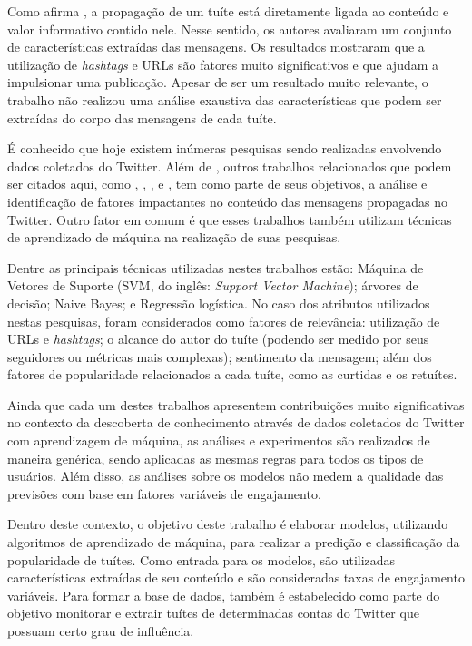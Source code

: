\documentclass[oneside,openright,12pt]{ufsm_2015} %
\begin{document}
{    \par Como afirma \cite{ieee:suh:10}, a propagação de um tuíte está diretamente ligada ao conteúdo e valor informativo contido nele. Nesse sentido, os autores avaliaram um conjunto de características extraídas das mensagens. Os resultados mostraram que a utilização de \textit{hashtags} e URLs são fatores muito significativos e que ajudam a impulsionar uma publicação. Apesar de ser um resultado muito relevante, o trabalho não realizou uma análise exaustiva das características que podem ser extraídas do corpo das mensagens de cada tuíte.
    
    \par É conhecido que hoje existem inúmeras pesquisas sendo realizadas envolvendo dados coletados do Twitter. Além de \cite{ieee:suh:10}, outros trabalhos relacionados que podem ser citados aqui, como \cite{acm:duan:2010}, \cite{benevenuto:2010}, \cite{acm:naveed:2011}, \cite{kharde:2016} e \cite{ieee:xu:2012}, tem como parte de seus objetivos, a análise e identificação de fatores impactantes no conteúdo das mensagens propagadas no Twitter. Outro fator em comum é que esses trabalhos também utilizam técnicas de aprendizado de máquina na realização de suas pesquisas.
    
    \par Dentre as principais técnicas utilizadas nestes trabalhos estão: Máquina de Vetores de Suporte (SVM, do inglês: \textit{Support Vector Machine}); árvores de decisão; Naive Bayes; e Regressão logística. No caso dos atributos utilizados nestas pesquisas, foram considerados como fatores de relevância: utilização de URLs e \textit{hashtags}; o alcance do autor do tuíte (podendo ser medido por seus seguidores ou métricas mais complexas); sentimento da mensagem; além dos fatores de popularidade relacionados a cada tuíte, como as curtidas e os retuítes.
    
    \par Ainda que cada um destes trabalhos apresentem contribuições muito significativas no contexto da descoberta de conhecimento através de dados coletados do Twitter com aprendizagem de máquina, as análises e experimentos são realizados de maneira genérica, sendo aplicadas as mesmas regras para todos os tipos de usuários. Além disso, as análises sobre os modelos não medem a qualidade das previsões com base em fatores variáveis de engajamento.

    \par Dentro deste contexto, o objetivo deste trabalho é elaborar modelos, utilizando algoritmos de aprendizado de máquina, para realizar a predição e classificação da popularidade de tuítes. Como entrada para os modelos, são utilizadas características extraídas de seu conteúdo e são consideradas taxas de engajamento variáveis. Para formar a base de dados, também é estabelecido como parte do objetivo monitorar e extrair tuítes de determinadas contas do Twitter que possuam certo grau de influência.
    
}
\end{document}
